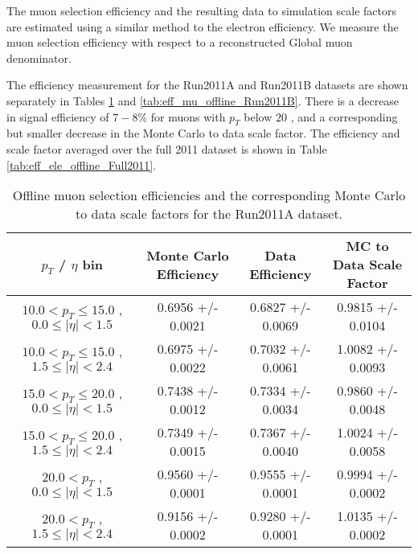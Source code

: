 
The muon selection efficiency and the resulting data to simulation
scale factors are estimated using a similar method to the electron efficiency. 
We measure the muon selection efficiency with respect to a reconstructed Global muon
denominator. 

The efficiency measurement for the Run2011A and Run2011B datasets are shown
separately in Tables \ref{tab:eff_mu_offline_Run2011A} and \ref{tab:eff_mu_offline_Run2011B}. 
There is a decrease in signal efficiency of $7-8\%$ for muons with 
$p_{T}$ below $20$ \GeV, and a corresponding but smaller decrease in the 
Monte Carlo to data scale factor. The efficiency and scale factor
averaged over the full 2011 dataset is shown in Table \ref{tab:eff_ele_offline_Full2011}.




 \begin{table}[!ht]
 \begin{center} 
 \begin{tabular}{|c|c|c|c|}
 \hline
 $p_{T}$ / $\eta$ bin    &  Monte Carlo Efficiency    &  Data Efficiency   &  MC to Data Scale Factor \\   \hline           
$ 10.0 < p_{T} \le  15.0$ , $  0.0  \le |\eta| <   1.5$   &       0.6956 +/- 0.0021   &       0.6827 +/- 0.0069   &       0.9815 +/- 0.0104   \\   
\hline
$ 10.0 < p_{T} \le  15.0$ , $  1.5  \le |\eta| <   2.4$   &       0.6975 +/- 0.0022   &       0.7032 +/- 0.0061   &       1.0082 +/- 0.0093   \\   
\hline
$ 15.0 < p_{T} \le  20.0$ , $  0.0  \le |\eta| <   1.5$   &       0.7438 +/- 0.0012   &       0.7334 +/- 0.0034   &       0.9860 +/- 0.0048   \\   
\hline
$ 15.0 < p_{T} \le  20.0$ , $  1.5  \le |\eta| <   2.4$   &       0.7349 +/- 0.0015   &       0.7367 +/- 0.0040   &       1.0024 +/- 0.0058   \\   
\hline
$ 20.0 < p_{T} $ , $  0.0  \le |\eta| <   1.5$   &       0.9560 +/- 0.0001   &       0.9555 +/- 0.0001   &       0.9994 +/- 0.0002   \\   
\hline
$ 20.0 < p_{T} $ , $  1.5  \le |\eta| <   2.4$   &       0.9156 +/- 0.0002   &       0.9280 +/- 0.0001   &       1.0135 +/- 0.0002   \\   
\hline
\end{tabular}
\caption{Offline muon selection efficiencies and the corresponding Monte Carlo to data scale factors for the
Run2011A dataset.}
\label{tab:eff_mu_offline_Run2011A}
\end{center}
\end{table}


